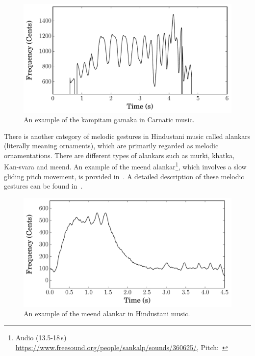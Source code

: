 \begin{figure}
	\begin{center}
		\includegraphics[width=\figSizeEighty]{ch02_background/figures/Kampitam_on_N2_Todi.pdf}
	\end{center}
	\caption[An example of the \gls{kampitam} \gls{gamaka} in Carnatic music]{An example of the \gls{kampitam} \gls{gamaka} in Carnatic music.}
	\label{fig:kampita_todi}
\end{figure}


There is another category of melodic gestures in Hindustani music called \glspl{alankar} (literally meaning ornaments), which are primarily regarded as melodic ornamentations. There are different types of \glspl{alankar} such as \gls{murki}, \gls{khatka}, Kan-\gls{svara} and \gls{meend}. An example of the \gls{meend} \gls{alankar}\footnote{Audio (13.5-18\,s) \url{https://www.freesound.org/people/sankalp/sounds/360625/}, Pitch:~}, which involves a slow gliding pitch movement, is provided in~. A detailed description of these melodic gestures can be found in~\cite{Bagchee1998}.

\begin{figure}
	\begin{center}
		\includegraphics[width=\figSizeEighty]{ch02_background/figures/DemoAlankar_13_5__18.pdf}
	\end{center}
	\caption[An example of the \gls{meend} \gls{alankar} in Hindustani music]{An example of the \gls{meend} \gls{alankar} in Hindustani music.}
	\label{fig:meend_todi}
\end{figure}


